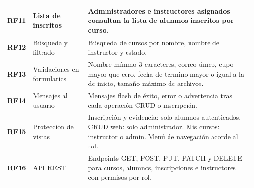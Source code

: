 \documentclass[11pt,letterpaper]{article}
\begin{document}
\begin{center}
\begin{longtable}{|>{\bfseries}p{1.1cm}|p{3cm}|p{10.5cm}|}
			RF11 & Lista de inscritos & Administradores e instructores asignados consultan la lista de alumnos inscritos por curso. \\ \hline
			\rowcolor{grisAlt}
			RF12 & B\'usqueda y filtrado & B\'usqueda de cursos por nombre, nombre de instructor y estado. \\ \hline
			RF13 & Validaciones en formularios & Nombre m\'inimo 3 caracteres, correo \'unico, cupo mayor que cero, fecha de t\'ermino mayor o igual a la de inicio, tama\~no m\'aximo de archivos. \\ \hline
			\rowcolor{grisAlt}
			RF14 & Mensajes al usuario & Mensajes flash de \'exito, error o advertencia tras cada operaci\'on CRUD o inscripci\'on. \\ \hline
			RF15 & Protecci\'on de vistas & Inscripci\'on y evidencia: solo alumnos autenticados. CRUD web: solo administrador. Mis cursos: instructor o admin. Men\'u de navegaci\'on acorde al rol. \\ \hline
			\rowcolor{grisAlt}
			RF16 & API REST & Endpoints GET, POST, PUT, PATCH y DELETE para cursos, alumnos, inscripciones e instructores con permisos por rol. \\ \hline
		\end{longtable}
	\end{center}
	
\end{document}
